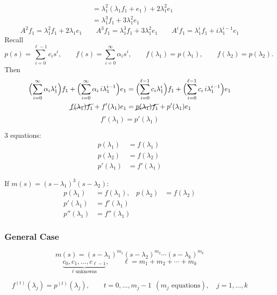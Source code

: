 \begin{example}
\begin{align*}
&= \lambda_1^2(\lambda_1f_1+e_1) + 2\lambda_1^2e_1\\
&= \lambda_1^3f_1 + 3\lambda_1^2e_1
\end{align*}
\[
\boxed{A^2f_1 = \lambda_1^2 f_1 + 2\lambda_1 e_1}
\qquad
\boxed{A^3f_1 = \lambda_1^3f_1 + 3\lambda_1^2e_1}
\qquad
\boxed{A^if_1 = \lambda_1^if_1 + i\lambda_1^{i-1}e_1}
\]
Recall
\[
p(s) = \sum_{i=0}^{\ell-1}c_is^i, \qquad f(s) = \sum_{i=0}^{\infty}\alpha_is^i, \qquad f(\lambda_1) = p(\lambda_1), \qquad f(\lambda_2) = p(\lambda_2).
\]
Then
\begin{align*}
\Bigl(\sum_{i=0}^{\infty}\alpha_i\lambda_1^i\Bigr)f_1 + \Bigl(\sum_{i=0}^{\infty}\alpha_i\, i\lambda_1^{i-1}\Bigr)e_1
&= \Bigl(\sum_{i=0}^{\ell-1}c_i\lambda_1^i\Bigr)f_1 + \Bigl(\sum_{i=0}^{\ell-1}c_i\, i\lambda_1^{i-1}\Bigr)e_1\\
\cancel{f(\lambda_1)f_1} + f'(\lambda_1)e_1 &= \cancel{p(\lambda_1)f_1} + p'(\lambda_1)e_1
\end{align*}
\[
\boxed{f'(\lambda_1) = p'(\lambda_1)}
\]

\begin{minipage}[t]{0.45\textwidth}
3 equations:
\begin{align*}
p(\lambda_1) &= f(\lambda_1)\\
p(\lambda_2) &= f(\lambda_2)\\
p'(\lambda_1) &= f'(\lambda_1)
\end{align*}
\end{minipage}\hfill
\begin{minipage}[t]{0.5\textwidth}
If $m(s) = (s-\lambda_1)^3(s-\lambda_2)$:
\begin{align*}
p(\lambda_1) &= f(\lambda_1), & p(\lambda_2) &= f(\lambda_2)\\
p'(\lambda_1) &= f'(\lambda_1) & &\\
p''(\lambda_1) &= f''(\lambda_1) & &
\end{align*}
\end{minipage}
\end{example}

\subsubsection{General Case}
\[
m(s) = (s-\lambda_1)^{m_1}(s-\lambda_2)^{m_2}\cdots(s-\lambda_k)^{m_k}
\]
\[
\underbrace{c_0,c_1,\dots,c_{\ell-1}}_{\ell\text{ unknowns}}, \qquad \ell = m_1 + m_2 + \cdots + m_k
\]
\begin{keybox}
\[
f^{(t)}(\lambda_j) = p^{(t)}(\lambda_j), \qquad
t = 0,\dots,m_j-1 \ \ (m_j \text{ equations}), \quad j = 1,\dots,k
\]
\end{keybox}

